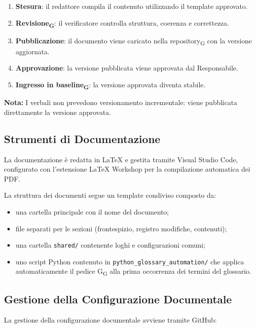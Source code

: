 \begin{enumerate}
    \item \textbf{Stesura}: il redattore compila il contenuto utilizzando il template approvato.
    \item \textbf{Revisione\textsubscript{G}}: il verificatore controlla struttura, coerenza e correttezza.
    \item \textbf{Pubblicazione}: il documento viene caricato nella repository\textsubscript{G} con la versione aggiornata.
    \item \textbf{Approvazione}: la versione pubblicata viene approvata dal Responsabile.
    \item \textbf{Ingresso in baseline\textsubscript{G}}: la versione approvata diventa stabile.
\end{enumerate}

\textbf{Nota:} I verbali non prevedono versionamento incrementale: viene pubblicata direttamente la
versione approvata.

\subsection{Strumenti di Documentazione}

La documentazione è redatta in \LaTeX{} e gestita tramite Visual Studio Code, configurato con
l’estensione LaTeX Workshop per la compilazione automatica dei PDF. 

La struttura dei documenti segue un template condiviso composto da:

\begin{itemize}
    \item una cartella principale con il nome del documento;
    \item file separati per le sezioni (frontespizio, registro modifiche, contenuti);
    \item una cartella \texttt{shared/} contenente loghi e configurazioni comuni;
    \item uno script Python  contenuto in \texttt{python\_glossary\_automation/} che applica automaticamente il pedice G\textsubscript{G} alla prima occorrenza dei termini del glossario.
\end{itemize}

\subsection{Gestione della Configurazione Documentale}

La gestione della configurazione documentale avviene tramite GitHub:

